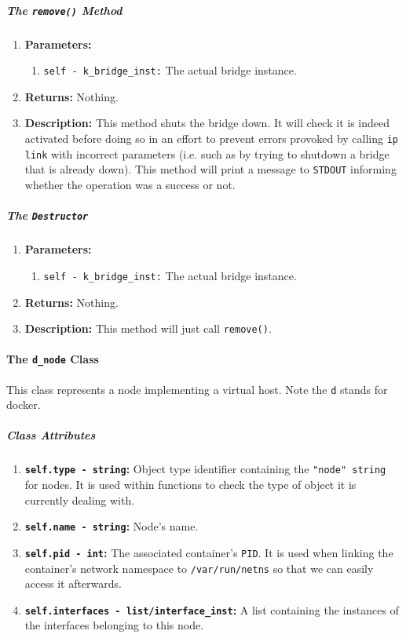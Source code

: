         \subparagraph{The \texttt{remove()} Method}
            \begin{enumerate}
                \item \textbf{Parameters:}
                \begin{enumerate}
                    \item \texttt{self - k\_bridge\_inst:} The actual bridge instance.
                \end{enumerate}
                \item \textbf{Returns:} Nothing.
                \item \textbf{Description:} This method shuts the bridge down. It will check it is indeed activated before doing so in an effort to prevent errors provoked by calling \texttt{ip link} with incorrect parameters (i.e. such as by trying to shutdown a bridge that is already down). This method will print a message to \texttt{STDOUT} informing whether the operation was a success or not.
            \end{enumerate}

        \subparagraph{The \texttt{Destructor}}
            \begin{enumerate}
                \item \textbf{Parameters:}
                \begin{enumerate}
                    \item \texttt{self - k\_bridge\_inst:} The actual bridge instance.
                \end{enumerate}
                \item \textbf{Returns:} Nothing.
                \item \textbf{Description:} This method will just call \texttt{remove()}.
            \end{enumerate}

    \paragraph{The \texttt{d\_node} Class}
        This class represents a node implementing a virtual host. Note the \texttt{d} stands for docker.

        \subparagraph{Class Attributes}
            \begin{enumerate}
                \item \textbf{\texttt{self.type - string}:} Object type identifier containing the \texttt{"node" string} for nodes. It is used within functions to check the type of object it is currently dealing with.
                \item \textbf{\texttt{self.name - string}:} Node's name.
                \item \textbf{\texttt{self.pid - int}:} The associated container's \texttt{PID}. It is used when linking the container's network namespace to \texttt{/var/run/netns} so that we can easily access it afterwards.
                \item \textbf{\texttt{self.interfaces - list/interface\_inst}:}  A list containing the instances of the interfaces belonging to this node.
            \end{enumerate}

